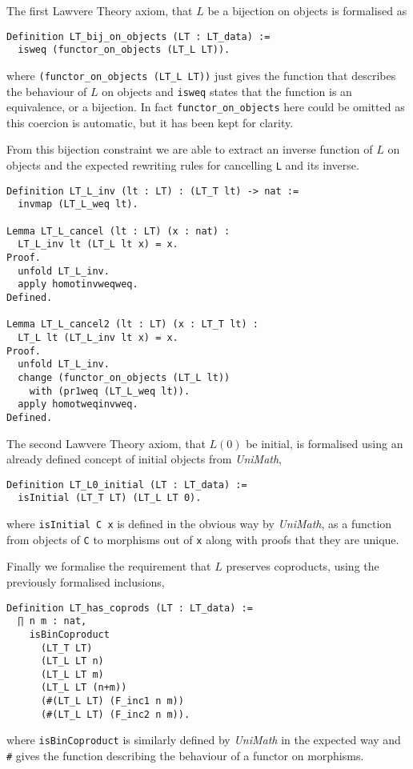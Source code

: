 The first Lawvere Theory axiom, that $L$ be a bijection on objects is formalised
as
\begin{lstlisting}
Definition LT_bij_on_objects (LT : LT_data) := 
  isweq (functor_on_objects (LT_L LT)).
\end{lstlisting}
where \lstinline|(functor_on_objects (LT_L LT))| just gives the function that
describes the behaviour of $L$ on objects and \lstinline|isweq| states that the
function is an equivalence, or a bijection. In fact \lstinline|functor_on_objects|
here could be omitted as this coercion is automatic, but it has been kept for
clarity.

From this bijection constraint we are able to extract an inverse function of $L$
on objects and the expected rewriting rules for cancelling \lstinline|L| and its
inverse.
\begin{lstlisting}
Definition LT_L_inv (lt : LT) : (LT_T lt) -> nat :=
  invmap (LT_L_weq lt).

Lemma LT_L_cancel (lt : LT) (x : nat) : 
  LT_L_inv lt (LT_L lt x) = x.
Proof.
  unfold LT_L_inv.
  apply homotinvweqweq.
Defined.
  
Lemma LT_L_cancel2 (lt : LT) (x : LT_T lt) : 
  LT_L lt (LT_L_inv lt x) = x.
Proof.
  unfold LT_L_inv.
  change (functor_on_objects (LT_L lt)) 
    with (pr1weq (LT_L_weq lt)).
  apply homotweqinvweq.
Defined.
\end{lstlisting}

The second Lawvere Theory axiom, that $L(0)$ be initial, is formalised using an
already defined concept of initial objects from \textit{UniMath},
\begin{lstlisting}
Definition LT_L0_initial (LT : LT_data) := 
  isInitial (LT_T LT) (LT_L LT 0).
\end{lstlisting}
where \lstinline|isInitial C x| is defined in the obvious way by
\textit{UniMath}, as a function from objects of \lstinline|C| to morphisms out
of \lstinline|x| along with proofs that they are unique.

Finally we formalise the requirement that $L$ preserves coproducts, using the
previously formalised inclusions,
\begin{lstlisting}
Definition LT_has_coprods (LT : LT_data) := 
  ∏ n m : nat, 
    isBinCoproduct 
      (LT_T LT)
      (LT_L LT n)
      (LT_L LT m)
      (LT_L LT (n+m))
      (#(LT_L LT) (F_inc1 n m)) 
      (#(LT_L LT) (F_inc2 n m)).
\end{lstlisting}
where \lstinline|isBinCoproduct| is similarly defined by \textit{UniMath} in the
expected way and \lstinline|#| gives the function describing the behaviour of a
functor on morphisms.

